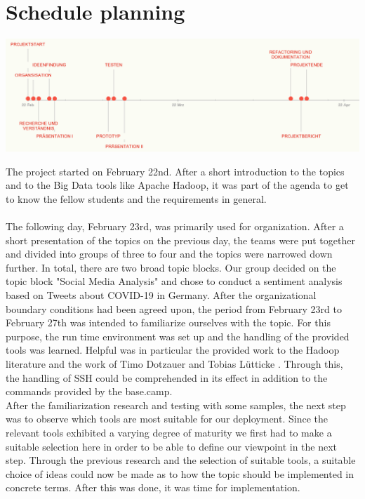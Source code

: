 \documentclass[
    fontsize=12pt,
    headings=small,
    parskip=half,           %
    bibliography=totoc,
    numbers=noenddot,       %
    open=any,               %
    ]{scrreprt}
\begin{document}
\newpage

\section{Schedule planning}

\begin{center}
    \includegraphics[scale=.5]{meilensteinplan.png}  
\end{center}

\bigbreak
The project started on February 22nd. After a short introduction to the topics and to the Big Data tools like Apache Hadoop, it was part of the agenda to get to know the fellow students and the requirements in general.\\\\
The following day, February 23rd, was primarily used for organization. After a short presentation of the topics on the previous day, the teams were put together and divided into groups of three to four and the topics were narrowed down further. In total, there are two broad topic blocks. Our group decided on the topic block "Social Media Analysis" and chose to conduct a sentiment analysis based on Tweets about COVID-19 in Germany.
After the organizational boundary conditions had been agreed upon, the period from February 23rd to February 27th was intended to familiarize ourselves with the topic. For this purpose, the run time environment was set up and the handling of the provided tools was learned. Helpful was in particular the provided work to the Hadoop literature and the work of Timo Dotzauer and Tobias Lütticke \cite{dotzauer2006}. Through this, the handling of SSH could be comprehended in its effect in addition to the commands provided by the base.camp.\\

After the familiarization research and testing with some samples, the next step was to observe which tools are most suitable for our deployment. Since the relevant tools exhibited a varying degree of maturity we first had to make a suitable selection here in order to be able to define our viewpoint in the next step. Through the previous research and the selection of suitable tools, a suitable choice of ideas could now be made as to how the topic should be implemented in concrete terms. After this was done, it was time for implementation.  \\
\end{document}

